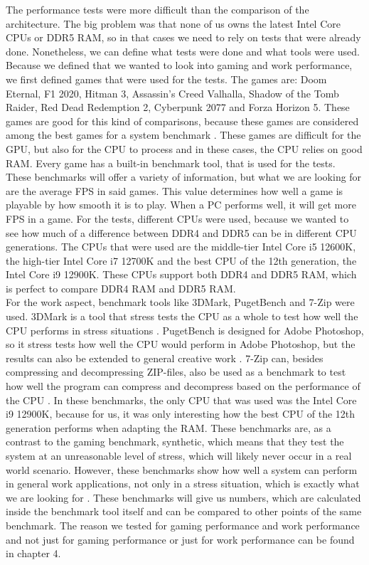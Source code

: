 The performance tests were more difficult than the comparison of the architecture. The big problem was that none of us owns the latest Intel Core CPUs or DDR5 RAM, so in that cases we need to rely on tests that were already done. Nonetheless, we can define what tests were done and what tools were used. Because we defined that we wanted to look into gaming and work performance, we first defined games that were used for the tests. The games are: Doom Eternal, F1 2020, Hitman 3, Assassin's Creed Valhalla, Shadow of the Tomb Raider, Red Dead Redemption 2, Cyberpunk 2077 and Forza Horizon 5. These games are good for this kind of comparisons, because these games are considered among the best games for a system benchmark \parencite{best_games}. These games are difficult for the GPU, but also for the CPU to process and in these cases, the CPU relies on good RAM. Every game has a built-in benchmark tool, that is used for the tests. These benchmarks will offer a variety of information, but what we are looking for are the average \gls{FPS} in said games. This value determines how well a game is playable by how smooth it is to play. When a PC performs well, it will get more FPS in a game. For the tests, different CPUs were used, because we wanted to see how much of a difference between DDR4 and DDR5 can be in different CPU generations. The CPUs that were used are the middle-tier Intel Core i5 12600K, the high-tier Intel Core i7 12700K and the best CPU of the 12th generation, the Intel Core i9 12900K. These CPUs support both DDR4 and DDR5 RAM, which is perfect to compare DDR4 RAM and DDR5 RAM.
\\
For the work aspect, benchmark tools like 3DMark, PugetBench and 7-Zip were used. 3DMark is a tool that stress tests the CPU as a whole to test how well the CPU performs in stress situations \parencite{3dmark_def}. PugetBench is designed for Adobe Photoshop, so it stress tests how well the CPU would perform in Adobe Photoshop, but the results can also be extended to general creative work \parencite{what_is_pugetbench}. 7-Zip can, besides compressing and decompressing ZIP-files, also be used as a benchmark to test how well the program can compress and decompress based on the performance of the CPU \parencite{7zip_def}. In these benchmarks, the only CPU that was used was the Intel Core i9 12900K, because for us, it was only interesting how the best CPU of the 12th generation performs when adapting the RAM. These benchmarks are, as a contrast to the gaming benchmark, synthetic, which means that they test the system at an unreasonable level of stress, which will likely never occur in a real world scenario. However, these benchmarks show how well a system can perform in general work applications, not only in a stress situation, which is exactly what we are looking for \parencite{benchmark_differences}. These benchmarks will give us numbers, which are calculated inside the benchmark tool itself and can be compared to other points of the same benchmark. The reason we tested for gaming performance and work performance and not just for gaming performance or just for work performance can be found in chapter 4. 
